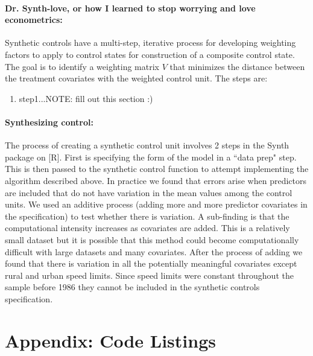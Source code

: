 \documentclass[letterpaper, 12pt]{article}
\begin{document}
\paragraph{Dr. Synth-love, or how I learned to stop worrying and love econometrics:}
Synthetic controls have a multi-step, iterative process for developing weighting factors to apply to control states for construction of a composite control state.  The goal is to identify a weighting matrix $V$ that minimizes the distance between the treatment covariates with the weighted control unit.  The steps are:

\begin{enumerate}
\item{step1...NOTE: fill out this section :)}
\end{enumerate}


\paragraph{Synthesizing control:} The process of creating a synthetic control unit involves 2 steps in the Synth package on [R].  First is specifying the form of the model in a ``data prep" step.  This is then passed to the synthetic control function to attempt implementing the algorithm described above.  In practice we found that errors arise when predictors are included that do not have variation in the mean values among the control units.  We used an additive process (adding more and more predictor covariates in the specification) to test whether there is variation.  A sub-finding is that the computational intensity increases as covariates are added.  This is a relatively small dataset but it is possible that this method could become computationally difficult with large datasets and many covariates.  After the process of adding we found that there is variation in all the potentially meaningful covariates except rural and urban speed limits.  Since speed limits were constant throughout the sample before 1986 they cannot be included in the synthetic controls specification.  

\section{Appendix: Code Listings}


\end{document}
